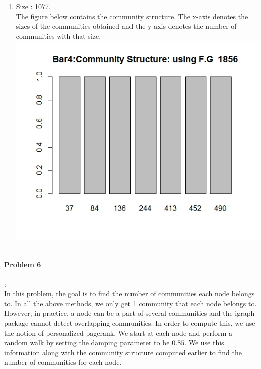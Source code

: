 \documentclass{article}
\begin{document}
\begin{enumerate}
 \item 
 Size : 1077.\\
 The figure below contains the community structure. The x-axis denotes the sizes of the communities obtained
 and the y-axis denotes the number of communities with that size.\\
 \includegraphics[scale=0.4]{p15}

 
 
 \end{enumerate}

 \hrule
 
\paragraph{Problem 6}:\\
In this problem, the goal is to find the number of communities each node belongs to. In all the above methods,
we only get 1 community that each node belongs to. However, in practice, a node can be a part of several communities and 
the igraph package cannot detect overlapping communities. In order to compute this, we use the notion of personalized pagerank.
We start at each node and perform a random walk by setting the damping parameter to be $0.85$. We use this information
along with the community structure computed earlier to find the number of communities for each node.\\
\end{document}

